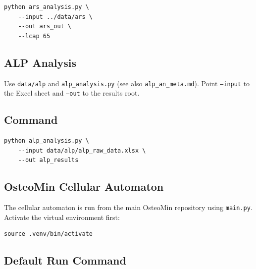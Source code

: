 \documentclass[11pt,a4paper]{article}
\begin{document}
\begin{center}
\begin{minipage}{0.9\linewidth}
\begin{verbatim}
python ars_analysis.py \
    --input ../data/ars \
    --out ars_out \
    --lcap 65
\end{verbatim}
\end{minipage}
\end{center}



\subsection{ALP Analysis}

Use \texttt{data/alp} and \texttt{alp\_analysis.py}  
(see also \texttt{alp\_an\_meta.md}).  
Point \texttt{--input} to the Excel sheet and \texttt{--out} to the results root.

\subsection*{Command}

\begin{center}
\begin{minipage}{0.9\linewidth}
\begin{verbatim}
python alp_analysis.py \
    --input data/alp/alp_raw_data.xlsx \
    --out alp_results
\end{verbatim}
\end{minipage}
\end{center}



\subsection{OsteoMin Cellular Automaton}

The cellular automaton is run from the main OsteoMin repository using
\texttt{main.py}.  
Activate the virtual environment first:

\begin{center}
\begin{minipage}{0.9\linewidth}
\begin{verbatim}
source .venv/bin/activate
\end{verbatim}
\end{minipage}
\end{center}

\subsection*{Default Run Command}
\end{document}
